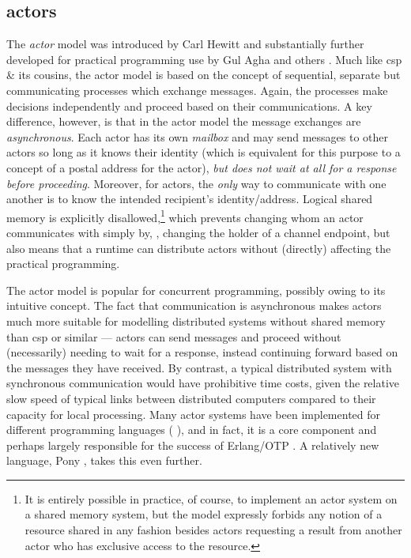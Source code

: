 \subsection{\label{subsec:back:actors}\texorpdfstring{\Glspl{actor}}{Actors}}
The \emph{\gls{actor}} model was introduced by Carl Hewitt \cite{Hewitt1973} and substantially further developed for practical programming use by Gul Agha and others \cite{Agha1986,Agha1997}.  Much like \gls{csp} \& its cousins, the \gls{actor} model is based on the concept of sequential, separate but communicating processes which exchange messages.  Again, the processes make decisions independently and proceed based on their communications.  A key difference, however, is that in the \gls{actor} model the message exchanges are \emph{asynchronous}.  Each \gls{actor} has its own \emph{mailbox} and may send messages to other \glspl{actor} so long as it knows their identity (which is equivalent for this purpose to a concept of a postal address for the \gls{actor}), \emph{but does not wait at all for a response before proceeding}.  Moreover, for \glspl{actor}, the \emph{only} way to communicate with one another is to know the intended recipient's identity/address.  Logical shared memory is explicitly disallowed,\footnote{It is entirely possible in practice, of course, to implement an \gls{actor} system on a shared memory system, but the model expressly forbids any notion of a resource shared in any fashion besides \glspl{actor} requesting a result from another \gls{actor} who has exclusive access to the resource.} which prevents changing whom an \gls{actor} communicates with simply by, \eg{}, changing the holder of a channel endpoint, but also means that a runtime can distribute actors without (directly) affecting the practical programming.

The \gls{actor} model is popular for concurrent programming, possibly owing to its intuitive concept.  The fact that communication is asynchronous makes \glspl{actor} much more suitable for modelling distributed systems without shared memory than \gls{csp} or similar --- \glspl{actor} can send messages and proceed without (necessarily) needing to wait for a response, instead continuing forward based on the messages they have received.  By contrast, a typical distributed system with synchronous communication would have prohibitive time costs, given the relative slow speed of typical links between distributed computers compared to their capacity for local processing.  Many \gls{actor} systems have been implemented for different programming languages (\eg{} \cite{Varela2001,Srinivasan2008,Charousset2016,Bernstein2016}), and in fact, it is a core component and perhaps largely responsible for the success of Erlang/OTP \cite{Armstrong2010,Armstrong2013,Vinoski2012}.  A relatively new language, Pony \cite{Clebsch2015,Clebsch2017}, takes this even further.

